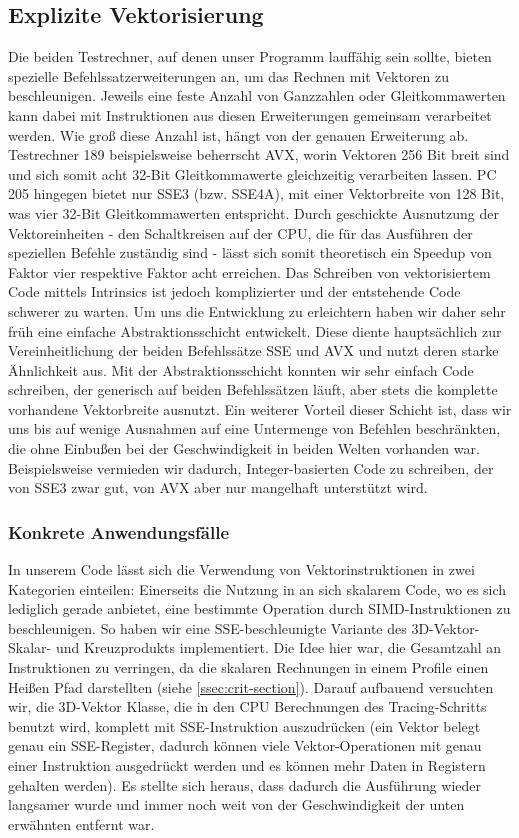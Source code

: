 \subsection{Explizite Vektorisierung}
Die beiden Testrechner, auf denen unser Programm lauffähig sein sollte, bieten spezielle Befehlssatzerweiterungen an, um das Rechnen mit Vektoren zu beschleunigen.
Jeweils eine feste Anzahl von Ganzzahlen oder Gleitkommawerten kann dabei mit Instruktionen aus diesen Erweiterungen gemeinsam verarbeitet werden.
Wie groß diese Anzahl ist, hängt von der genauen Erweiterung ab.
Testrechner 189 beispielsweise beherrscht AVX, worin Vektoren 256 Bit breit sind und sich somit acht 32-Bit Gleitkommawerte gleichzeitig verarbeiten lassen.
PC 205 hingegen bietet nur SSE3 (bzw. SSE4A), mit einer Vektorbreite von 128 Bit, was vier 32-Bit Gleitkommawerten entspricht.
Durch geschickte Ausnutzung der Vektoreinheiten - den Schaltkreisen auf der CPU, die für das Ausführen der speziellen Befehle zuständig sind - lässt sich somit theoretisch ein Speedup von Faktor vier respektive Faktor acht erreichen.
Das Schreiben von vektorisiertem Code mittels Intrinsics ist jedoch komplizierter und der entstehende Code schwerer zu warten.
Um uns die Entwicklung zu erleichtern haben wir daher sehr früh eine einfache Abstraktionsschicht entwickelt.
Diese diente hauptsächlich zur Vereinheitlichung der beiden Befehlssätze SSE und AVX und nutzt deren starke Ähnlichkeit aus.
Mit der Abstraktionsschicht konnten wir sehr einfach Code schreiben, der generisch auf beiden Befehlssätzen läuft, aber stets die komplette vorhandene Vektorbreite ausnutzt.
Ein weiterer Vorteil dieser Schicht ist, dass wir uns bis auf wenige Ausnahmen auf eine Untermenge von Befehlen beschränkten, die ohne Einbußen bei der Geschwindigkeit in beiden Welten vorhanden war.
Beispielsweise vermieden wir dadurch, Integer-basierten Code zu schreiben, der von SSE3 zwar gut, von AVX aber nur mangelhaft unterstützt wird.

\subsubsection{Konkrete Anwendungsfälle}
In unserem Code lässt sich die Verwendung von Vektorinstruktionen in zwei Kategorien einteilen:
Einerseits die Nutzung in an sich skalarem Code, wo es sich lediglich gerade anbietet, eine bestimmte Operation durch SIMD-Instruktionen zu beschleunigen.
So haben wir eine SSE-beschleunigte Variante des 3D-Vektor-Skalar- und Kreuzprodukts implementiert.
Die Idee hier war, die Gesamtzahl an Instruktionen zu verringen, da die skalaren Rechnungen in einem Profile einen Heißen Pfad darstellten (siehe \ref{ssec:crit-section}).
Darauf aufbauend versuchten wir, die 3D-Vektor Klasse, die in den CPU Berechnungen des Tracing-Schritts benutzt wird, komplett mit SSE-Instruktion auszudrücken (ein Vektor belegt genau ein SSE-Register, dadurch können viele Vektor-Operationen mit genau einer Instruktion ausgedrückt werden und es können mehr Daten in Registern gehalten werden).
Es stellte sich heraus, dass dadurch die Ausführung wieder langsamer wurde und immer noch weit von der Geschwindigkeit der unten erwähnten  entfernt war.


